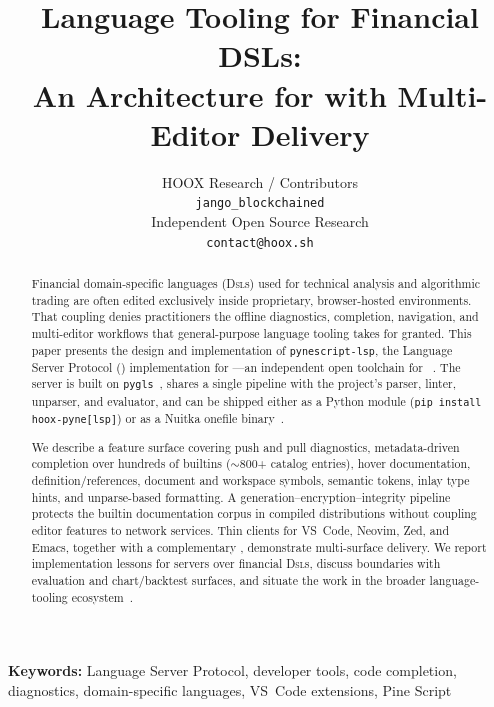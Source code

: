 \documentclass[11pt,a4paper]{article}
\title{%
  Language Tooling for Financial DSLs:\\
  An \lsp{} Architecture for \pine{} with Multi-Editor Delivery}
\author{%
  HOOX Research / \pyne{} Contributors\\
  \texttt{jango\_blockchained}\\
  Independent Open Source Research\\
  \texttt{contact@hoox.sh}}
\date{}
\begin{document}
\maketitle

\begin{abstract}
Financial domain-specific languages (\textsc{Dsl}s) used for technical analysis and
algorithmic trading are often edited exclusively inside proprietary, browser-hosted
environments. That coupling denies practitioners the offline diagnostics, completion,
navigation, and multi-editor workflows that general-purpose language tooling takes for
granted. This paper presents the design and implementation of \texttt{pynescript-lsp},
the Language Server Protocol (\lsp{}) implementation for \pyne{}---an independent open
toolchain for \pine{}~\citep{pynescript2026,tradingview-pine}. The server is built on
\texttt{pygls}~\citep{murphy2020pygls}, shares a single \ast{} pipeline with the project's
parser, linter, unparser, and evaluator, and can be shipped either as a Python module
(\texttt{pip install hoox-pyne[lsp]}) or as a Nuitka onefile binary~\citep{nuitka}.

We describe a feature surface covering push and pull diagnostics, metadata-driven
completion over hundreds of builtins (\(\sim\)800+ catalog entries), hover documentation,
definition/references, document and workspace symbols, semantic tokens, inlay type
hints, and unparse-based formatting. A generation--encryption--integrity pipeline
protects the builtin documentation corpus in compiled distributions without coupling
editor features to network services. Thin clients for VS~Code, Neovim, Zed, and Emacs,
together with a complementary \cli{}, demonstrate multi-surface delivery. We report
implementation lessons for \lsp{} servers over financial \textsc{Dsl}s, discuss
boundaries with evaluation and chart/backtest \api{} surfaces, and situate the work in
the broader language-tooling ecosystem~\citep{lsp2023,voutilainen2016lsp,fowler2010dsl}.
\end{abstract}

\vspace{0.5em}
\noindent\textbf{Keywords:}
Language Server Protocol, developer tools, code completion, diagnostics,
domain-specific languages, VS~Code extensions, Pine Script

\vspace{0.75em}
\noindent\footnotesize\textit{\trademarknote}
\normalsize

\tableofcontents
\newpage

\end{document}
